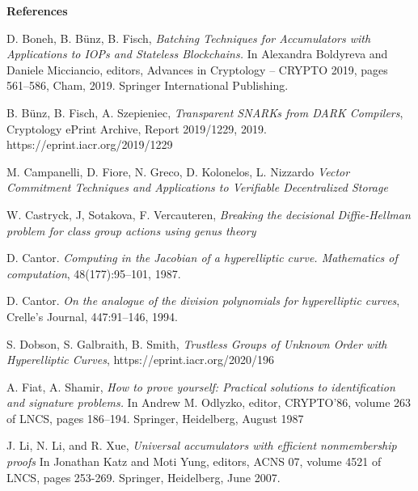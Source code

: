 \documentclass[11pt, lettersize, notitlepage, leqno, footskip=0.6cm]{article}
\newcommand{\noin}{\noindent}
\numberwithin{equation}{section}
\begin{document}
\bigskip



\begin{center}\textbf{References} \end{center}
\footnotesize

\noindent [BBF19] D. Boneh, B. B\"{u}nz, B. Fisch, \textit{Batching Techniques for Accumulators with Applications to IOPs and Stateless Blockchains.} In Alexandra Boldyreva and Daniele Micciancio, editors, Advances in Cryptology – CRYPTO 2019, pages 561–586, Cham, 2019. Springer International Publishing. \vspace{0.1cm}

\noindent [BFS19] B. B\"{u}nz, B. Fisch, A. Szepieniec, \textit{Transparent SNARKs from DARK Compilers}, Cryptology ePrint Archive, Report 2019/1229, 2019. https://eprint.iacr.org/2019/1229 \vspace{0.1cm}

\noindent [CFGKN20] M. Campanelli, D. Fiore, N. Greco, D. Kolonelos, L. Nizzardo \textit{Vector Commitment Techniques and Applications to Verifiable Decentralized Storage} \vspace{0.1cm}

\noin [CSV20] W. Castryck, J, Sotakova, F. Vercauteren, \textit{Breaking the decisional Diffie-Hellman problem for class group actions using genus theory}\vspace{0.1cm}

\noindent [Can87] D. Cantor. \textit{Computing in the Jacobian of a hyperelliptic curve. Mathematics of computation}, 48(177):95–101, 1987.\vspace{0.1cm}

\noindent [Can94] D. Cantor. \textit{On the analogue of the division polynomials for hyperelliptic curves}, Crelle's Journal, 447:91–146, 1994.\vspace{0.1cm}


\noindent [DGS20] S. Dobson, S. Galbraith, B. Smith, \textit{Trustless Groups of Unknown Order with Hyperelliptic Curves}, https://eprint.iacr.org/2020/196\vspace{0.1cm}

\noindent [FS87] A. Fiat, A. Shamir, \textit{How to prove yourself: Practical solutions to identification and signature problems.} In Andrew M. Odlyzko, editor, CRYPTO’86, volume 263 of LNCS, pages 186–194. Springer, Heidelberg, August 1987\vspace{0.1cm}

\noin [LLX07] J. Li, N. Li, and R. Xue,  \textit{Universal accumulators with efficient nonmembership proofs} In Jonathan Katz and Moti Yung, editors, ACNS 07, volume 4521 of LNCS, pages 253-269. Springer, Heidelberg, June 2007.
\end{document}
